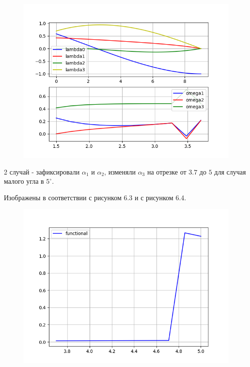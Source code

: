 \documentclass[14pt]{extreport}
\begin{document}
\begin{figure}[H]
\center\includegraphics[scale=0.7]{fig/ivp_and_control_1_5-3_7_50.png}
\caption{}
\end{figure}

2 случай - зафиксировали $\alpha_1$ и $\alpha_2$, изменяли $\alpha_3$ на отрезке от $3.7$ до $5$ для случая малого угла в $5^{\circ}$.

Изображены в соответствии с рисунком 6.3 и с рисунком 6.4.

\begin{figure}[H]
\center\includegraphics[scale=0.7]{fig/functional_3_7-5_5.png}
\caption{}
\end{figure}
\end{document}
